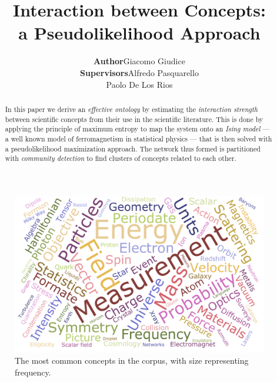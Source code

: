 \documentclass[a4paper,12pt,twoside]{article}
\newcommand{\email}[1]{{\href{mailto:#1}{#1}}}
\begin{document}
\title{\huge \sffamily\bfseries Interaction between Concepts:\\ a Pseudolikelihood Approach}
\date{}
\author{\begin{tabular}{r@{ }l} 
\sffamily \bfseries Author      & Giacomo Giudice \\[1ex] 
\sffamily \bfseries Supervisors &  Alfredo Pasquarello\\
             &  Paolo De Los Rios
\end{tabular}}
\maketitle
\thispagestyle{empty}

\begin{figure}[h]
  \centerline{\includegraphics[width=\textwidth]{../img/tagCloud.pdf}}
  \caption{The most common concepts in the corpus, with size representing frequency.}
  \label{fig:tags}
\end{figure}

\baselineskip=16pt
\parindent=15pt
\parskip=5pt

\begin{abstract}
In this paper we derive an {\em effective ontology} by estimating  the {\em interaction strength} between scientific concepts from their use in the scientific literature. This is done by applying the principle of maximum entropy to map the system onto an {\em Ising model} --- a well known model of ferromagnetism in statistical physics --- that is then solved with a pseudolikelihood maximization approach.
The network thus formed is partitioned with {\em community detection} to find clusters of concepts related to each other.
\end{abstract}
\newpage
\end{document}
